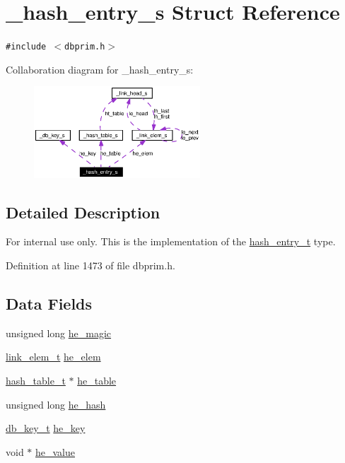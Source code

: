 \hypertarget{struct__hash__entry__s}{
\section{\_\-hash\_\-entry\_\-s Struct Reference}
\label{struct__hash__entry__s}
}
{\tt \#include $<$dbprim.h$>$}

Collaboration diagram for \_\-hash\_\-entry\_\-s:\begin{figure}[H]
\begin{center}
\leavevmode
\includegraphics[width=176pt]{struct__hash__entry__s__coll__graph}
\end{center}
\end{figure}


\subsection{Detailed Description}
\begin{Desc}
\item[For internal use only.]
This is the implementation of the \hyperlink{group__dbprim__hash_ga2}{hash\_\-entry\_\-t} type.\end{Desc}




Definition at line 1473 of file dbprim.h.\subsection*{Data Fields}
\begin{CompactItemize}
\item 
unsigned long \hyperlink{struct__hash__entry__s_o0}{he\_\-magic}
\item 
\hyperlink{struct__link__elem__s}{link\_\-elem\_\-t} \hyperlink{struct__hash__entry__s_o1}{he\_\-elem}
\item 
\hyperlink{struct__hash__table__s}{hash\_\-table\_\-t} $\ast$ \hyperlink{struct__hash__entry__s_o2}{he\_\-table}
\item 
unsigned long \hyperlink{struct__hash__entry__s_o3}{he\_\-hash}
\item 
\hyperlink{struct__db__key__s}{db\_\-key\_\-t} \hyperlink{struct__hash__entry__s_o4}{he\_\-key}
\item 
void $\ast$ \hyperlink{struct__hash__entry__s_o5}{he\_\-value}
\end{CompactItemize}



